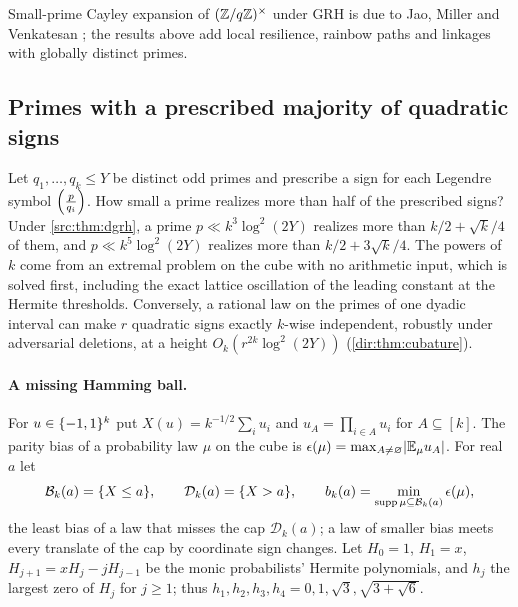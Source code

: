 Small-prime Cayley expansion of $(\mathbb{Z}/q\mathbb{Z})^\times$ under GRH is due to Jao, Miller and Venkatesan
\cite{JaoMillerVenkatesan2009Expander}; the results above add local resilience, rainbow paths and
linkages with globally distinct primes.

\subsection{Primes with a prescribed majority of quadratic signs}\label{dir:sec:signs}

Let $q_1,\dots,q_k\le Y$ be distinct odd primes and prescribe a sign for each Legendre symbol
$\Bigl(\frac{p}{q_i}\Bigr)$. How small a prime realizes more than half of the prescribed signs? Under
\cref{src:thm:dgrh}, a prime $p\ll k^3\log^2(2Y)$ realizes more than $k/2+\sqrt k/4$ of them,
and $p\ll k^5\log^2(2Y)$ realizes more than $k/2+3\sqrt k/4$. The powers of $k$ come from an
extremal problem on the cube with no arithmetic input, which is solved first, including the exact
lattice oscillation of the leading constant at the Hermite thresholds. Conversely, a rational law on the primes
of one dyadic interval can make $r$ quadratic signs exactly $k$-wise independent, robustly under
adversarial deletions, at a height $O_k(r^{2k}\log^2(2Y))$ (\cref{dir:thm:cubature}).

\paragraph{A missing Hamming ball.}
For $u\in\{-1,1\}^k$ put $X(u)=k^{-1/2}\sum_iu_i$ and $u_A=\prod_{i\in A}u_i$ for
$A\subseteq[k]$. The parity bias of a probability law $\mu$ on the cube is
$\epsilon(\mu)=\max_{A\ne\varnothing}\lvert\mathbb{E}_\mu u_A\rvert$. For real $a$ let
\[
 \mathcal B_k(a)=\{X\le a\},\qquad\mathcal D_k(a)=\{X>a\},\qquad
 b_k(a)=\min_{\operatorname{supp}\mu\subseteq\mathcal B_k(a)}\epsilon(\mu),
\]
the least bias of a law that misses the cap $\mathcal D_k(a)$; a law of smaller bias meets every
translate of the cap by coordinate sign changes. Let $H_0=1$, $H_1=x$,
$H_{j+1}=xH_j-jH_{j-1}$ be the monic probabilists' Hermite polynomials, and $h_j$ the largest zero
of $H_j$ for $j\ge1$; thus $h_1,h_2,h_3,h_4=0,1,\sqrt3,\sqrt{3+\sqrt6}$.

